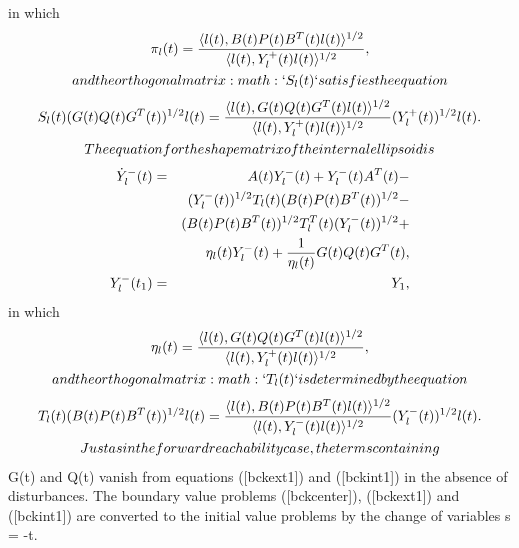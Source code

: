 \documentclass[letterpaper,10pt,english]{sphinxmanual}
\begin{document}
in which
\begin{gather}
\begin{split}  \pi_l(t) = \frac{\langle l(t),
  B(t)P(t)B^T(t)l(t)\rangle^{1/2}}{\langle l(t),
  Y^+_l(t)l(t)\rangle^{1/2}},\end{split}\notag\\\begin{split}and the orthogonal matrix :math:`S_l(t)` satisfies the equation\end{split}\notag
\end{gather}\begin{gather}
\begin{split}  S_l(t)(G(t)Q(t)G^T(t))^{1/2}l(t) = \frac{\langle l(t),
  G(t)Q(t)G^T(t)l(t)\rangle^{1/2}}{\langle l(t),
  Y_l^+(t)l(t)\rangle^{1/2}}(Y_l^{+}(t))^{1/2}l(t).\end{split}\notag\\\begin{split}The equation for the shape matrix of the internal ellipsoid is\end{split}\notag
\end{gather}\begin{gather}
\begin{split}\begin{aligned}
\dot{Y}^-_l(t) & = & A(t)Y^-_l(t) + Y^-_l(t)A^T(t) -\nonumber \\
& & (Y_l^{-}(t))^{1/2}T_l(t)(B(t)P(t)B^T(t))^{1/2} -\nonumber \\
& & (B(t)P(t)B^T(t))^{1/2}T_l^T(t)(Y_l^{-}(t))^{1/2} +\nonumber \\
& & \eta_l(t)Y^-_l(t) + \frac{1}{\eta_l(t)}G(t)Q(t)G^T(t), \label{bckint1} \\
Y^-_l(t_1) & = & Y_1, \label{bckint2}\end{aligned}\end{split}\notag
\end{gather}
in which
\begin{gather}
\begin{split}  \eta_l(t) = \frac{\langle l(t),
  G(t)Q(t)G^T(t)l(t)\rangle^{1/2}}{\langle l(t),
  Y^+_l(t)l(t)\rangle^{1/2}},\end{split}\notag\\\begin{split}and the orthogonal matrix :math:`T_l(t)` is determined by the equation\end{split}\notag
\end{gather}\begin{gather}
\begin{split}  T_l(t)(B(t)P(t)B^T(t))^{1/2}l(t) = \frac{\langle l(t),
  B(t)P(t)B^T(t)l(t)\rangle^{1/2}}{\langle l(t),
  Y_l^-(t)l(t)\rangle^{1/2}}(Y_l^{-}(t))^{1/2}l(t).\end{split}\notag\\\begin{split}Just as in the forward reachability case, the terms containing\end{split}\notag
\end{gather}
G(t) and Q(t) vanish from equations ({[}bckext1{]}) and
({[}bckint1{]}) in the absence of disturbances. The boundary value problems
({[}bckcenter{]}), ({[}bckext1{]}) and ({[}bckint1{]}) are converted to the initial
value problems by the change of variables s = -t.
\end{document}
